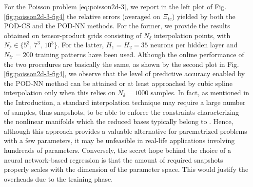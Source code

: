 \documentclass[12pt, a4paper, twoside, openright, notitlepage]{report}
\numberwithin{equation}{chapter}
\theoremstyle{theorem}
\theoremstyle{definition}
\theoremstyle{remark}
\theoremstyle{proposition}
\numberwithin{figure}{chapter}
\begin{document}
		For the Poisson problem \eqref{eq:poisson2d-3}, we report in the left plot of Fig. \ref{fig:poisson2d-3-fig4} the relative errors (averaged on $\Xi_{te}$) yielded by both the POD-CS and the POD-NN methods. For the former, we provide the results obtained on tensor-product grids consisting of $N_{\delta}$ interpolation points, with $N_{\delta} \in \lbrace 5^3, \, 7^3, \, 10^3 \rbrace$. For the latter, $H_1 = H_2 = 35$ neurons per hidden layer and $N_{tr} = 200$ training patterns have been used. Although the online performance of the two procedures are basically the same, as shown by the second plot in Fig. \ref{fig:poisson2d-3-fig4}, we observe that the level of predictive accuracy enabled by the POD-NN method can be attained or at least approached by cubic spline interpolation only when this relies on $N_{\delta} = 1000$ samples. In fact, as mentioned in the Introduction, a standard interpolation technique may require a large number of samples, thus snapshots, to be able to enforce the constraints characterizing the nonlinear manifolds which the reduced bases typically belong to \cite{Ams10}. Hence, although this approach provides a valuable alternative for paremetrized problems with a few parameters, it may be unfeasible in real-life applications involving hundreads of parameters. Conversely, the secret hope behind the choice of a neural network-based regression is that the amount of required snapshots properly scales with the dimension of the parameter space. This would justify the overheads due to the training phase.
		
\end{document}
